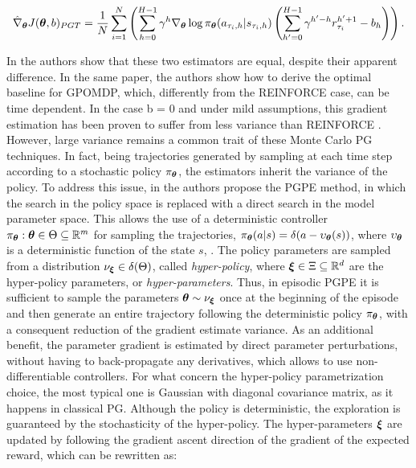 \begin{align}
\hat{\nabla}_{\boldsymbol{\theta}}J(\boldsymbol{\theta}, b)_{PGT} = \frac{1}{N}\sum_{i=1}^{N}\left(\sum_{h=0}^{H-1}\gamma^h\nabla_{\boldsymbol{\theta}}\log\pi_{\boldsymbol{\theta}}(a_{\tau_i,h}|s_{\tau_i,h})\left(\sum_{h'=0}^{H-1}\gamma^{h'-h}r^{h'+1}_{\tau_i} - b_h\right)\right).
\end{align}

In \cite{peters2008reinforcement} the authors show that these two estimators are equal, despite their apparent difference. In the same paper, the authors show how to derive the optimal baseline for \gls{GPOMDP}, which, differently from the  REINFORCE case, can be time dependent. In the case b = 0 and under mild assumptions, this gradient estimation has been proven to suffer from less variance than REINFORCE \cite{zhao2011analysis}. However, large variance remains a common trait of these Monte Carlo \gls{PG} techniques. In fact, being trajectories generated by sampling at each time step according to a stochastic policy $\pi_{\boldsymbol{\theta}}$, the estimators inherit the variance of the policy. To address this
issue, in \cite{sehnke2008policy} the authors propose the \gls{PGPE} method, in which the search in the policy space is replaced with a direct search in the model parameter space. This allows the use of a deterministic controller $\pi_{\boldsymbol{\theta}}: \boldsymbol{\theta}\in\Theta\subseteq\mathbb{R}^m$ for sampling the trajectories, \ie $\pi_{\boldsymbol{\theta}}(a|s)=\delta(a-\upsilon_{\boldsymbol{\theta}}(s))$, where $\upsilon_{\boldsymbol{\theta}}$ is a deterministic function of the state $s$, \eg \cite{sehnke2010parameter}. The policy parameters are sampled from a distribution $\nu_{\boldsymbol{\xi}}\in\delta(\Theta)$, called \emph{hyper-policy}, where $\boldsymbol{\xi}\in\Xi\subseteq\mathbb{R}^d$ are the hyper-policy parameters, or \emph{hyper-parameters}. Thus, in episodic \gls{PGPE} it is sufficient to sample the parameters $\boldsymbol{\theta}\sim\nu_{\boldsymbol{\xi}}$ once at the beginning of the episode and then generate an entire trajectory following the deterministic policy $\pi_{\boldsymbol{\theta}}$, with a consequent reduction of the gradient estimate variance. As an additional benefit, the parameter gradient is estimated by direct parameter perturbations, without having to back-propagate any derivatives, which allows to use non-differentiable controllers. For what concern the hyper-policy parametrization choice, the most typical one is Gaussian with diagonal covariance matrix, as it happens in classical \gls{PG}. Although the policy is deterministic, the exploration is guaranteed by the stochasticity of the hyper-policy. The hyper-parameters $\boldsymbol{\xi}$ are updated by following the gradient ascent direction of the gradient of the expected reward, which can be rewritten as:

